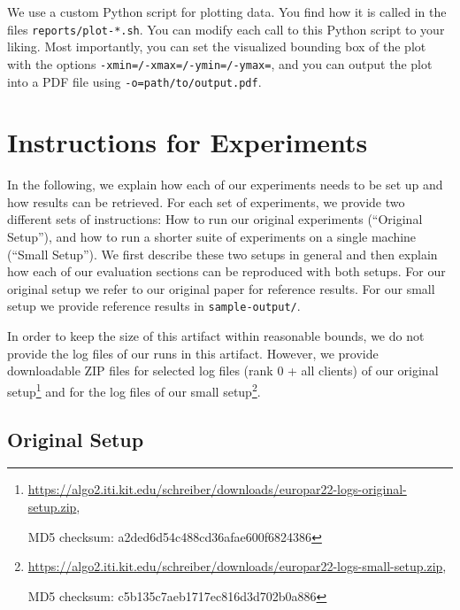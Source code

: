 \documentclass[runningheads]{article}
\numberwithin{dummy}{subsection}
\begin{document}
We use a custom Python script for plotting data.
You find how it is called in the files \texttt{reports/plot-*.sh}.
You can modify each call to this Python script to your liking.
Most importantly, you can set the visualized bounding box of the plot with the options \texttt{-xmin=/-xmax=/-ymin=/-ymax=}, and you can output the plot into a PDF file using \texttt{-o=path/to/output.pdf}.














\section{Instructions for Experiments}

In the following, we explain how each of our experiments needs to be set up and how results can be retrieved.
For each set of experiments, we provide two different sets of instructions: How to run our original experiments (``Original Setup''), and how to run a shorter suite of experiments on a single machine (``Small Setup'').
We first describe these two setups in general and then explain how each of our evaluation sections can be reproduced with both setups.
For our original setup we refer to our original paper for reference results.
For our small setup we provide reference results in \texttt{sample-output/}.

In order to keep the size of this artifact within reasonable bounds, we do not provide the log files of our runs in this artifact.
However, we provide downloadable ZIP files for selected log files (rank 0 + all clients) of our original setup\footnote{\url{https://algo2.iti.kit.edu/schreiber/downloads/europar22-logs-original-setup.zip},

\hspace*{0.4cm}MD5 checksum: a2ded6d54c488cd36afae600f6824386} and for the log files of our small setup\footnote{\url{https://algo2.iti.kit.edu/schreiber/downloads/europar22-logs-small-setup.zip}, 

\hspace*{0.4cm}MD5 checksum: c5b135c7aeb1717ec816d3d702b0a886}.

\subsection{Original Setup}
\label{sec:original-setup}
\end{document}
